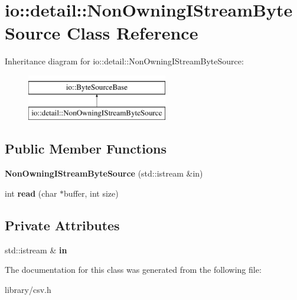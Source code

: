\hypertarget{classio_1_1detail_1_1NonOwningIStreamByteSource}{}\section{io\+:\+:detail\+:\+:Non\+Owning\+I\+Stream\+Byte\+Source Class Reference}
\label{classio_1_1detail_1_1NonOwningIStreamByteSource}
Inheritance diagram for io\+:\+:detail\+:\+:Non\+Owning\+I\+Stream\+Byte\+Source\+:\begin{figure}[H]
\begin{center}
\leavevmode
\includegraphics[height=2.000000cm]{classio_1_1detail_1_1NonOwningIStreamByteSource}
\end{center}
\end{figure}
\subsection*{Public Member Functions}
\begin{DoxyCompactItemize}
\item 
\mbox{\label{classio_1_1detail_1_1NonOwningIStreamByteSource_aacb55ba2f52ba1c30810697d6aa92169}} 
{\bfseries Non\+Owning\+I\+Stream\+Byte\+Source} (std\+::istream \&in)
\item 
\mbox{\label{classio_1_1detail_1_1NonOwningIStreamByteSource_ac7b1968c8314896d7ec0ebb97fdda30d}} 
int {\bfseries read} (char $\ast$buffer, int size)
\end{DoxyCompactItemize}
\subsection*{Private Attributes}
\begin{DoxyCompactItemize}
\item 
\mbox{\label{classio_1_1detail_1_1NonOwningIStreamByteSource_a42ec07be9409b77a17bdf08cfa73739d}} 
std\+::istream \& {\bfseries in}
\end{DoxyCompactItemize}


The documentation for this class was generated from the following file\+:\begin{DoxyCompactItemize}
\item 
library/csv.\+h\end{DoxyCompactItemize}
